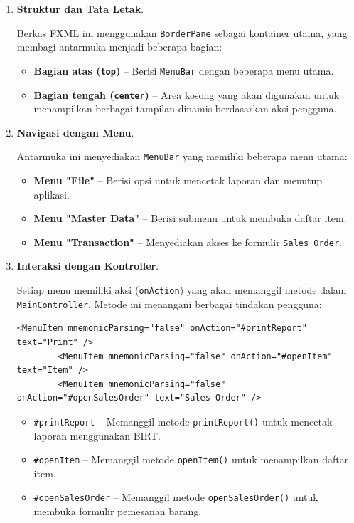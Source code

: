 \begin{enumerate}
	\item \textbf{Struktur dan Tata Letak}.
	
	Berkas FXML ini menggunakan \texttt{BorderPane} sebagai kontainer utama, yang membagi antarmuka menjadi beberapa bagian:
	
	\begin{itemize}
		\item \textbf{Bagian atas (\texttt{top})} – Berisi \texttt{MenuBar} dengan beberapa menu utama.
		\item \textbf{Bagian tengah (\texttt{center})} – Area kosong yang akan digunakan untuk menampilkan berbagai tampilan dinamis berdasarkan aksi pengguna.
	\end{itemize}
	
	\item \textbf{Navigasi dengan Menu}.
	
	Antarmuka ini menyediakan \texttt{MenuBar} yang memiliki beberapa menu utama:
	
	\begin{itemize}
		\item \textbf{Menu "File"} – Berisi opsi untuk mencetak laporan dan menutup aplikasi.
		\item \textbf{Menu "Master Data"} – Berisi submenu untuk membuka daftar item.
		\item \textbf{Menu "Transaction"} – Menyediakan akses ke formulir \texttt{Sales Order}.
	\end{itemize}
	
	\item \textbf{Interaksi dengan Kontroller}.
	
	Setiap menu memiliki aksi (\texttt{onAction}) yang akan memanggil metode dalam \texttt{MainController}. Metode ini menangani berbagai tindakan pengguna:
	
	\begin{lstlisting}[style=XmlStyle]
		<MenuItem mnemonicParsing="false" onAction="#printReport" text="Print" />
		<MenuItem mnemonicParsing="false" onAction="#openItem" text="Item" />
		<MenuItem mnemonicParsing="false" onAction="#openSalesOrder" text="Sales Order" />
	\end{lstlisting}
	
	\begin{itemize}
		\item \texttt{\#printReport} – Memanggil metode \texttt{printReport()} untuk mencetak laporan menggunakan BIRT.
		\item \texttt{\#openItem} – Memanggil metode \texttt{openItem()} untuk menampilkan daftar item.
		\item \texttt{\#openSalesOrder} – Memanggil metode \texttt{openSalesOrder()} untuk membuka formulir pemesanan barang.
	\end{itemize}
	

\end{enumerate}
